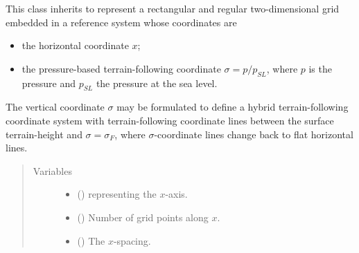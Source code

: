 \documentclass[letterpaper,10pt,english]{sphinxmanual}
\begin{document}

\begin{fulllineitems}
\label{\detokenize{api:grids.sigma.Sigma2d}}
This class inherits {\hyperref[\detokenize{api:grids.grid_xz.GridXZ}]{}} to represent a rectangular and regular
two-dimensional grid embedded in a reference system whose coordinates are
\begin{itemize}
\item {} 
the horizontal coordinate \(x\);

\item {} 
the pressure-based terrain-following coordinate \(\sigma = p / p_{SL}\),                  where \(p\) is the pressure and \(p_{SL}\) the pressure at the sea level.

\end{itemize}

The vertical coordinate \(\sigma\) may be formulated to define a hybrid terrain-following coordinate system
with terrain-following coordinate lines between the surface terrain-height and \(\sigma = \sigma_F\), where
\(\sigma\)-coordinate lines change back to flat horizontal lines.
\begin{quote}\begin{description}
\item[{Variables}] \leavevmode\begin{itemize}
\item {} 
{\hyperref[\detokenize{api:grids.grid_xyz.GridXYZ.x}]{}} () \textendash{} {\hyperref[\detokenize{api:grids.axis.Axis}]{}} representing the \(x\)-axis.

\item {} 
{\hyperref[\detokenize{api:grids.grid_xyz.GridXYZ.nx}]{}} () \textendash{} Number of grid points along \(x\).

\item {} 
{\hyperref[\detokenize{api:grids.grid_xyz.GridXYZ.dx}]{}} () \textendash{} The \(x\)-spacing.


\end{itemize}
\end{description}
\end{quote}
\end{fulllineitems}
\end{document}
